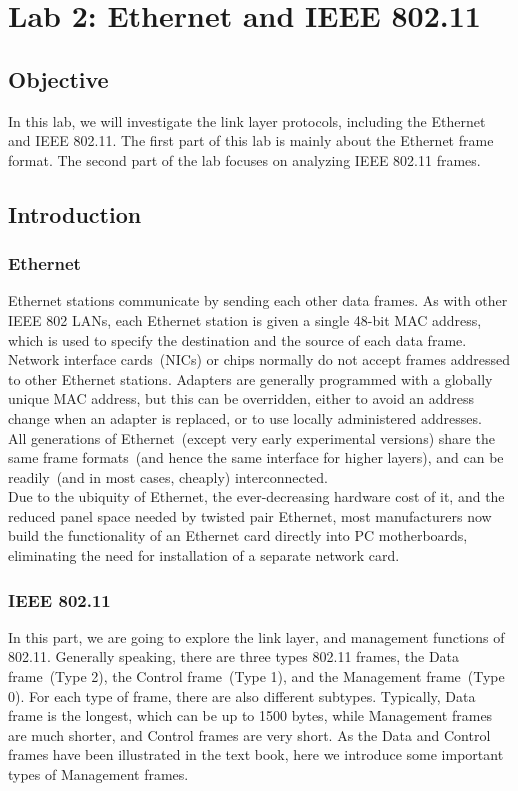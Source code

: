 \chapter{Lab 2: Ethernet and IEEE 802.11}\label{Lab2}

\section{Objective}
\noindent  In this lab, we will investigate the link layer protocols, including the Ethernet and IEEE 802.11. The first part of this lab is mainly about the Ethernet frame format. The second part of the lab focuses on analyzing IEEE 802.11 frames.

\section{Introduction}
\subsection{Ethernet}
\noindent  Ethernet stations communicate by sending each other data frames. As with other IEEE 802 LANs, each Ethernet station is given a single 48-bit MAC address, which is used to specify the destination and the source of each data frame. Network interface cards~(NICs) or chips normally do not accept frames addressed to other Ethernet stations. Adapters are generally programmed with a globally unique MAC address, but this can be overridden, either to avoid an address change when an adapter is replaced, or to use locally administered addresses.\\

\noindent All generations of Ethernet~(except very early experimental versions) share the same frame formats~(and hence the same interface for higher layers), and can be readily~(and in most cases, cheaply) interconnected.\\

\noindent Due to the ubiquity of Ethernet, the ever-decreasing hardware cost of it, and the reduced panel space needed by twisted pair Ethernet, most manufacturers now build the functionality of an Ethernet card directly into PC motherboards, eliminating the need for installation of a separate network card.

\subsection{IEEE 802.11}
In this part, we are going to explore the link layer, and management functions of 802.11. Generally speaking, there are three types 802.11 frames, the Data frame~(Type 2), the Control frame~(Type 1), and the Management frame~(Type 0). For each type of frame, there are also different subtypes. Typically, Data frame is the longest, which can be up to 1500 bytes, while Management frames are much shorter, and Control frames are very short. As the Data and Control frames have been illustrated in the text book, here we introduce some important types of Management frames.

